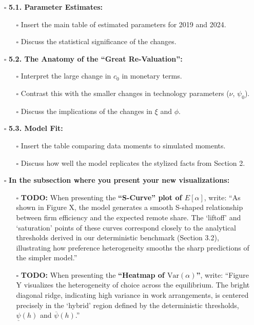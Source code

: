 \documentclass[
  11pt,
  letterpaper,
  DIV=11,
  numbers=noendperiod]{scrartcl}
\providecommand{\tightlist}{%
  \setlength{\itemsep}{0pt}\setlength{\parskip}{0pt}}\usepackage{longtable,booktabs,array}
\begin{document}
\begin{itemize}
\tightlist
\item[$\square$]
  \textbf{5.1. Parameter Estimates:}

  \begin{itemize}
  \tightlist
  \item[$\square$]
    Insert the main table of estimated parameters for 2019 and 2024.
  \item[$\square$]
    Discuss the statistical significance of the changes.
  \end{itemize}
\item[$\square$]
  \textbf{5.2. The Anatomy of the ``Great Re-Valuation'':}

  \begin{itemize}
  \tightlist
  \item[$\square$]
    Interpret the large change in \(c_0\) in monetary terms.
  \item[$\square$]
    Contrast this with the smaller changes in technology parameters
    (\(\nu\), \(\psi_0\)).
  \item[$\square$]
    Discuss the implications of the changes in \(\xi\) and \(\phi\).
  \end{itemize}
\item[$\square$]
  \textbf{5.3. Model Fit:}

  \begin{itemize}
  \tightlist
  \item[$\square$]
    Insert the table comparing data moments to simulated moments.
  \item[$\square$]
    Discuss how well the model replicates the stylized facts from
    Section 2.
  \end{itemize}
\item[$\square$]
  \textbf{In the subsection where you present your new visualizations:}

  \begin{itemize}
  \tightlist
  \item[$\square$]
    \textbf{TODO:} When presenting the \textbf{``S-Curve'' plot of
    \(E[\alpha]\)}, write: ``As shown in Figure X, the model generates a
    smooth S-shaped relationship between firm efficiency and the
    expected remote share. The `liftoff' and `saturation' points of
    these curves correspond closely to the analytical thresholds derived
    in our deterministic benchmark (Section 3.2), illustrating how
    preference heterogeneity smooths the sharp predictions of the
    simpler model.''
  \item[$\square$]
    \textbf{TODO:} When presenting the \textbf{``Heatmap of
    \(\text{Var}(\alpha)\)''}, write: ``Figure Y visualizes the
    heterogeneity of choice across the equilibrium. The bright diagonal
    ridge, indicating high variance in work arrangements, is centered
    precisely in the `hybrid' region defined by the deterministic
    thresholds, \(\underline{\psi}(h)\) and \(\overline{\psi}(h)\).''
  \end{itemize}
\end{itemize}
\end{document}
